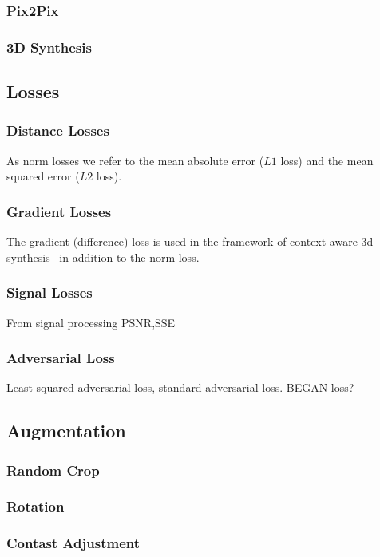 \subsubsection{Pix2Pix}

\subsubsection{3D Synthesis}

\subsection{Losses}

\subsubsection{Distance Losses}

As norm losses we refer to the mean absolute error ($L1$ loss) and the
mean squared error ($L2$ loss).

\subsubsection{Gradient Losses}

The gradient (difference) loss is used in the framework of context-aware
3d synthesis~\cite{Nie16} in addition to the norm loss.

\subsubsection{Signal Losses}

From signal processing PSNR,SSE

\subsubsection{Adversarial Loss}

Least-squared adversarial loss, standard adversarial loss. BEGAN loss?


\subsection{Augmentation}

\subsubsection{Random Crop}
\subsubsection{Rotation}
\subsubsection{Contast Adjustment}

